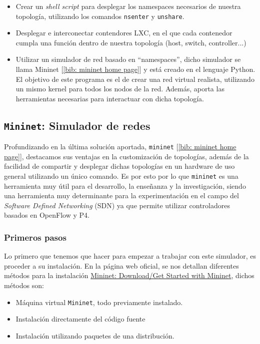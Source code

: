 \documentclass[12pt]{article}
\begin{document}
	\begin{itemize}
		\item Crear un \textit{shell script} para desplegar los namespaces necesarios de nuestra topología, utilizando los comandos \texttt{nsenter} y \texttt{unshare}.
		\item Desplegar e interconectar contendores LXC, en el que cada contenedor cumpla una función dentro de nuestra topología (host, switch, controller...)
		\item Utilizar un simulador de red basado en ``namespaces'', dicho simulador se llama Mininet [\ref{bib: mininet home page}] y está creado en el lenguaje Python. El objetivo de este programa es el de crear una red virtual realista, utilizando un mismo kernel para todos los nodos de la red. Además, aporta las herramientas necesarias para interactuar con dicha topología.
	\end{itemize}
	
	\vspace{10px}
	
	\subsection{\texttt{Mininet}: Simulador de redes}
	
	\noindent Profundizando en la última solución aportada, \texttt{mininet} [\ref{bib: mininet home page}], destacamos sus ventajas en la customización de topologías, además de la facilidad de compartir y desplegar dichas topologías en un hardware de uso general utilizando un único comando. Es por esto por lo que \texttt{mininet} es una herramienta muy útil para el desarrollo, la enseñanza y la investigación, siendo una herramienta muy determinante para la experimentación en el campo del \textit{Software Defined Networking} (SDN) ya que permite utilizar controladores basados en OpenFlow y P4.
	
	\subsubsection{Primeros pasos}
	\noindent Lo primero que tenemos que hacer para empezar a trabajar con este simulador, es proceder a su instalación. En la página web oficial, se nos detallan diferentes métodos para la instalación \href{http://mininet.org/download/}{Mininet: Download/Get Started with Mininet}, dichos métodos son: 
	
	\begin{itemize}
		\item Máquina virtual \texttt{Mininet}, todo previamente instalado.
		\item Instalación directamente del código fuente
		\item Instalación utilizando paquetes de una distribución.
	\end{itemize}
\end{document}
